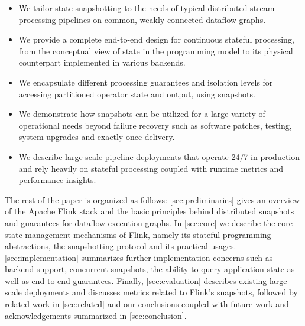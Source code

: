 \begin{itemize}
	\item We tailor state snapshotting to the needs of typical distributed stream processing pipelines on common, weakly connected dataflow graphs.
	\item We provide a complete end-to-end design for continuous stateful processing, from the conceptual view of state in the programming model to its physical counterpart implemented in various backends.
	\item We encapsulate different processing guarantees and isolation levels for accessing partitioned operator state and output, using snapshots.
	\item We demonstrate how snapshots can be utilized for a large variety of operational needs beyond failure recovery such as software patches, testing, system upgrades and exactly-once delivery.
	\item We describe  large-scale pipeline  deployments that operate 24/7 in production and rely heavily on stateful processing coupled with runtime metrics and performance insights.
\end{itemize}

The rest of the paper is organized as follows: \autoref{sec:preliminaries} gives an overview of the Apache Flink stack and the basic principles behind distributed snapshots and guarantees for dataflow execution graphs. In \autoref{sec:core} we describe the core state management mechanisms of Flink, namely its stateful programming abstractions, the snapshotting protocol and its practical usages. \autoref{sec:implementation} summarizes further implementation concerns such as backend support, concurrent snapshots, the ability to query application state as well as end-to-end guarantees. Finally, \autoref{sec:evaluation} describes existing large-scale deployments and discusses metrics related to Flink's snapshots, followed by related work in \autoref{sec:related} and our conclusions coupled with future work and acknowledgements summarized in \autoref{sec:conclusion}. 
